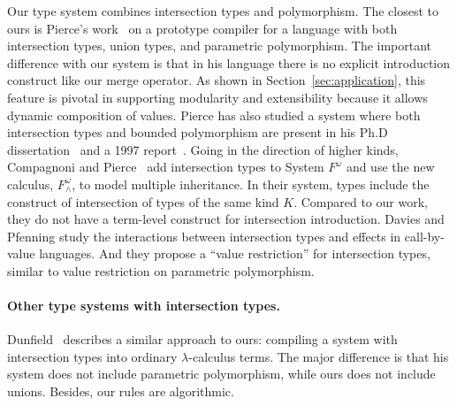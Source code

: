 Our type system combines intersection types and polymorphism. The closest to
ours is Pierce's work~\cite{pierce1991programming1} on a prototype compiler for
a language with both intersection types, union types, and parametric
polymorphism. The important difference with our system is that in his language
there is no explicit introduction construct like our merge operator. As shown in
Section~\ref{sec:application}, this feature is pivotal in supporting modularity
and extensibility because it allows dynamic composition of values. Pierce has
also studied a system where both intersection types and bounded polymorphism are
present in his Ph.D dissertation~\cite{pierce1991programming2} and a 1997
report~\cite{pierce1997intersection}. Going in the direction of higher kinds,
Compagnoni and Pierce~\cite{compagnoni1996higher} add intersection types to
System $ F^{\omega} $ and use the new calculus, $ F^{\omega}_{\wedge} $, to
model multiple inheritance. In their system, types include the construct of
intersection of types of the same kind $ K $. Compared to our work, they do not
have a term-level construct for intersection introduction. Davies and Pfenning
\cite{davies2000intersection} study the interactions between intersection types
and effects in call-by-value languages. And they propose a ``value restriction''
for intersection types, similar to value restriction on parametric polymorphism.

\paragraph{Other type systems with intersection types.}

Dunfield~\cite{dunfield2014elaborating} describes a similar approach to ours:
compiling a system with intersection types into ordinary $ \lambda $-calculus
terms. The major difference is that his system does not include parametric
polymorphism, while ours does not include unions. Besides, our rules are
algorithmic.


